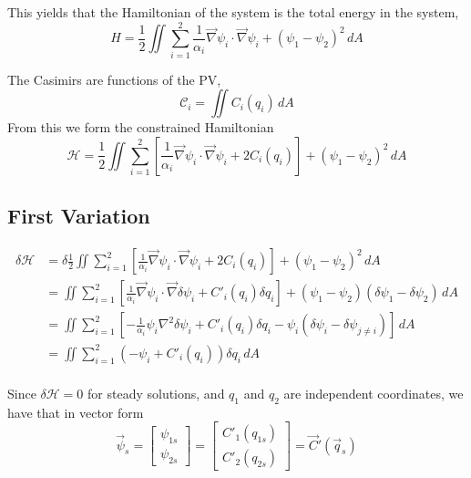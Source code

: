 \documentclass[12pt]{article}
\begin{document}
    This yields that the Hamiltonian of the system is the total energy in the system,
    $$
    H = \frac12 \iint \sum_{i=1}^2 \frac{1}{\alpha_i}\vec\nabla \psi_i \cdot \vec\nabla \psi_i + (\psi_1 - \psi_2)^2 \, dA
    $$

    The Casimirs are functions of the PV,
    $$
    \mathcal{C}_i = \iint C_i(q_i) \, dA
    $$
    From this we form the constrained Hamiltonian
    \begin{equation}
      \mathcal{H} = \frac12 \iint \sum_{i=1}^2 \left[ \frac{1}{\alpha_i} \vec\nabla \psi_i \cdot \vec\nabla \psi_i + 2C_i(q_i) \right]+ (\psi_1 - \psi_2)^2 \, dA
      \label{eqn:qg_tl_h}
    \end{equation}

  \subsection{First Variation}
    \begin{align*}
      \delta \mathcal{H} &= \delta \frac12 \iint \sum_{i=1}^2 \left[ \frac{1}{\alpha_i} \vec\nabla \psi_i \cdot \vec\nabla \psi_i + 2C_i(q_i) \right]+ (\psi_1 - \psi_2)^2 \, dA \\
       &= \iint \sum_{i=1}^2 \left[ \frac{1}{\alpha_i} \vec\nabla \psi_i \cdot \vec\nabla \delta\psi_i + C'_i(q_i) \delta q_i \right]+ (\psi_1 - \psi_2)(\delta \psi_1 - \delta \psi_2) \, dA \\
       &= \iint \sum_{i=1}^2 \left[ -\frac{1}{\alpha_i} \psi_i \nabla^2 \delta\psi_i + C'_i(q_i) \delta q_i - \psi_i(\delta \psi_i - \delta \psi_{j \ne i}) \right] \, dA \\
       &= \iint \sum_{i=1}^2 (-\psi_i + C'_i(q_i)) \delta q_i\, dA \\
    \end{align*}

    Since $\delta \mathcal{H} = 0$ for steady solutions, and $q_1$ and $q_2$ are independent coordinates, we have that in vector form
    \begin{equation}
      \vec \psi_s = 
      \left[\begin{array}{c}
        \psi_{1s} \\
        \psi_{2s}
      \end{array}\right]
      =
      \left[\begin{array}{c}
        C'_1(q_{1s}) \\
        C'_2(q_{2s})
      \end{array}\right]
      =
      \vec C'(\vec q_s)
    \end{equation}
\end{document}
